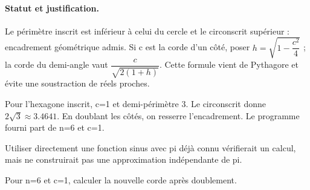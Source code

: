 \paragraph{Statut et justification.} Le périmètre inscrit est inférieur à celui du cercle et le circonscrit supérieur : encadrement géométrique admis. Si c est la corde d’un côté, poser $h=\sqrt {1-\dfrac{c^2}{4}}$ ; la corde du demi-angle vaut $\dfrac{c}{\sqrt {2(1+h)}}$. Cette formule vient de Pythagore et évite une soustraction de réels proches.
\begin{example}Pour l’hexagone inscrit, c=1 et demi-périmètre 3. Le circonscrit donne $2\sqrt3\approx\num{3,4641}$. En doublant les côtés, on resserre l’encadrement. Le programme fourni part de n=6 et c=1.\end{example}\label{C10-EX5}
\begin{pitfall}Utiliser directement une fonction sinus avec pi déjà connu vérifierait un calcul, mais ne construirait pas une approximation indépendante de pi.\end{pitfall}
\begin{application}Pour n=6 et c=1, calculer la nouvelle corde après doublement.\end{application}\label{C10-AP5}
\mxnewpage

